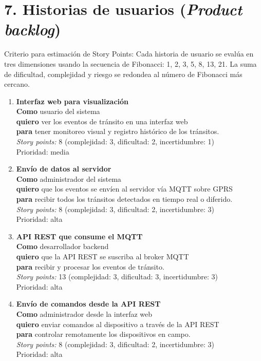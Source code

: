 \documentclass[
11pt, %
]{charter}
\begin{document}
\section{7. Historias de usuarios (\textit{Product backlog})}
\label{sec:backlog}
Criterio para estimación de Story Points: Cada historia de usuario se evalúa en tres
dimensiones usando la secuencia de Fibonacci: 1, 2, 3, 5, 8, 13, 21. La suma de dificultad,
complejidad y riesgo se redondea al número de Fibonacci más cercano.
\begin{enumerate}

\item \textbf{Interfaz web para visualización}\\
\textbf{Como} usuario del sistema\\
\textbf{quiero} ver los eventos de tránsito en una interfaz web\\
\textbf{para} tener monitoreo visual y registro histórico de los tránsitos.\\
\textit{Story points:} 8 (complejidad: 3, dificultad: 2, incertidumbre: 1)\\
Prioridad: media

\item \textbf{Envío de datos al servidor}\\
\textbf{Como} administrador del sistema\\
\textbf{quiero} que los eventos se envíen al servidor vía MQTT sobre GPRS\\
\textbf{para} recibir todos los tránsitos detectados en tiempo real o diferido.\\
\textit{Story points:} 8 (complejidad: 3, dificultad: 2, incertidumbre: 3)\\
Prioridad: alta

\item \textbf{API REST que consume el MQTT}\\
\textbf{Como} desarrollador backend\\
\textbf{quiero} que la API REST se suscriba al broker MQTT\\
\textbf{para} recibir y procesar los eventos de tránsito.\\
\textit{Story points:} 13 (complejidad: 3, dificultad: 3, incertidumbre: 3)\\
Prioridad: alta

\item \textbf{Envío de comandos desde la API REST}\\
\textbf{Como} administrador desde la interfaz web\\
\textbf{quiero} enviar comandos al dispositivo a través de la API REST\\
\textbf{para} controlar remotamente los dispositivos en campo.\\
\textit{Story points:} 8 (complejidad: 3, dificultad: 2, incertidumbre: 3)\\
Prioridad: alta


\end{enumerate}
\end{document}
